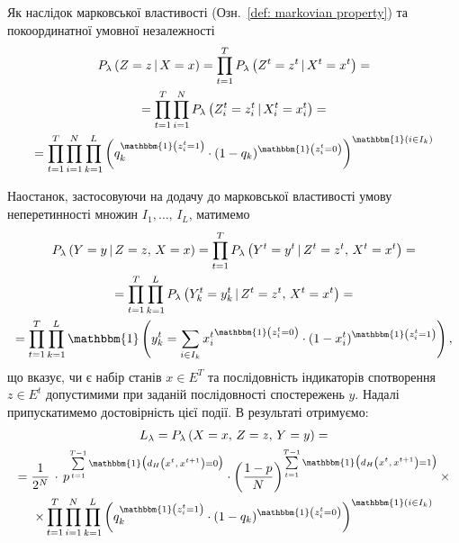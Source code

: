 Як наслідок марковської властивості (Озн.~\ref{def: markovian property}) та покоординатної умовної незалежності
\begin{multline*}
    P_\lambda \left( Z=z \,|\, X=x \right) = \prod_{t=1}^T P_\lambda \left( Z^t=z^t \,|\, X^t=x^t \right) = \\ 
    = \prod_{t=1}^T \prod_{i=1}^N P_\lambda \left( Z^t_i=z^t_i \,|\, X^t_i=x^t_i \right) = \\ 
    = \prod_{t=1}^T \prod_{i=1}^N \prod_{k=1}^L \left( q_k^{\mathbbm{1} \left( z^t_i =1 \right)} \cdot (1-q_k)^{\mathbbm{1} \left( z^t_i =0 \right)} \right)^{\mathbbm{1} \left( i \in I_k \right)}
\end{multline*}

\newpage
Наостанок, застосовуючи на додачу до марковської властивості умову неперетинності множин $I_1,\ldots,\,I_L$, матимемо
\begin{multline*}
    P_\lambda \left( Y=y \,|\, Z=z,\,X=x \right) = \prod_{t=1}^T P_\lambda \left( Y^t=y^t \,|\, Z^t=z^t,\,X^t=x^t \right) = \\ 
    = \prod_{t=1}^T \prod_{k=1}^L P_\lambda \left( Y^t_k=y^t_k \,|\, Z^t=z^t,\,X^t=x^t \right) = \\ 
    = \prod_{t=1}^T \prod_{k=1}^L \mathbbm{1} \left( y^t_k = \sum\limits_{i \in I_k} {x^t_i}^{\mathbbm{1} \left( z^t_i=0 \right)} \cdot (1-x^t_i)^{\mathbbm{1} \left( z^t_i=1 \right)} \right),
\end{multline*}
що вказує, чи є набір станів $x \in E^T$ та послідовність індикаторів спотворення $z \in E^t$ допустимими при заданій послідовності спостережень $y$. Надалі припускатимемо достовірність цієї події. В результаті отримуємо:
\begin{multline*}
    L_{\lambda} = P_\lambda \left( X=x,\,Z=z,\,Y=y \right) = \\ 
    = \frac{1}{2^N}\, \cdot\, p^{\sum\limits_{t=1}^{T-1} \mathbbm{1} \bigl( d_H\left( x^t,\,x^{t+1} \right) = 0 \bigr)} \cdot \left(\frac{1-p}{N}\right)^{\sum\limits_{t=1}^{T-1} \mathbbm{1} \bigl( d_H\left( x^t,\,x^{t+1} \right) = 1 \bigr)} \times \\
    \times \prod_{t=1}^T \prod_{i=1}^N \prod_{k=1}^L \left( q_k^{\mathbbm{1} \left( z^t_i =1 \right)} \cdot (1-q_k)^{\mathbbm{1} \left( z^t_i =0 \right)} \right)^{\mathbbm{1} \left( i \in I_k \right)}
\end{multline*}

